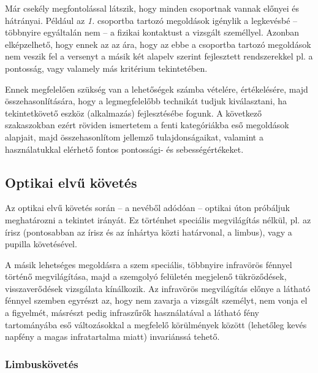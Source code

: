 Már csekély megfontolással látszik, hogy minden csoportnak vannak előnyei és hátrányai. Például az \emph{1.} csoportba tartozó megoldások igénylik a legkevésbé -- többnyire egyáltalán nem -- a fizikai kontaktust a vizsgált személlyel. Azonban elképzelhető, hogy ennek az az ára, hogy az ebbe a csoportba tartozó megoldások nem veszik fel a versenyt a másik két alapelv szerint fejlesztett rendszerekkel pl. a pontosság, vagy valamely más kritérium tekintetében.

Ennek megfelelően szükség van a lehetőségek számba vételére, értékelésére, majd összehasonlítására, hogy a legmegfelelőbb technikát tudjuk kiválasztani, ha tekintetkövető eszköz (alkalmazás) fejlesztésébe fogunk. A következő szakaszokban ezért röviden ismertetem a fenti kategóriákba eső megoldások alapjait, majd összehasonlítom jellemző tulajdonságaikat, valamint a használatukkal elérhető fontos pontossági- és sebességértékeket.

\subsection{Optikai elvű követés}\label{sect:optikai}

Az optikai elvű követés során -- a nevéből adódóan -- optikai úton próbáljuk meghatározni a tekintet irányát. Ez történhet speciális megvilágítás nélkül, pl. az írisz (pontosabban az írisz és az ínhártya közti határvonal, a limbus), vagy a pupilla követésével.

A másik lehetséges megoldásra a szem speciális, többnyire infravörös fénnyel történő megvilágítása, majd a szemgolyó felületén megjelenő tükröződések, visszaverődések vizsgálata kínálkozik. Az infravörös megvilágítás előnye a látható fénnyel szemben egyrészt az, hogy nem zavarja a vizsgált személyt, nem vonja el a figyelmét, másrészt pedig infraszűrők használatával a látható fény tartományába eső változásokkal a megfelelő körülmények között (lehetőleg kevés napfény a magas infratartalma miatt) invariánssá tehető.

\subsubsection{Limbuskövetés}\label{sect:limbusz}

